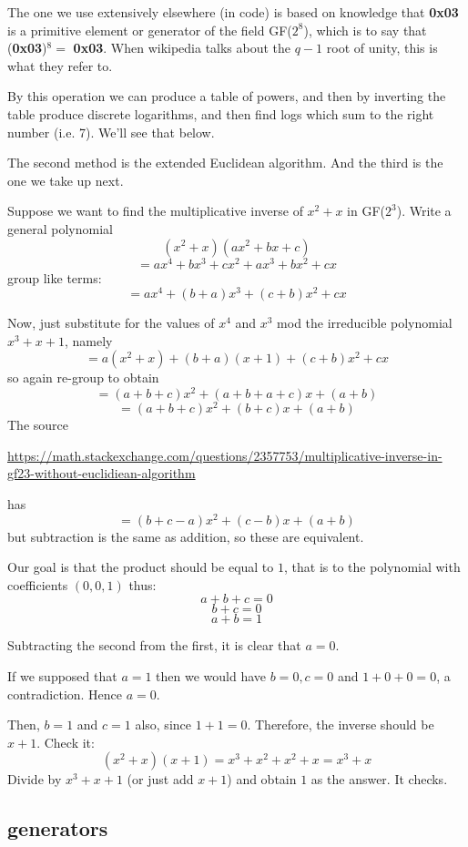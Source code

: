 \documentclass[11pt, oneside]{article}
\begin{document}
The one we use extensively elsewhere (in code) is based on knowledge that \textbf{0x03} is a primitive element or generator of the field GF($2^8$), which is to say that (\textbf{0x03})$^8 =$ \textbf{0x03}.  When wikipedia talks about the $q-1$ root of unity, this is what they refer to.

By this operation we can produce a table of powers, and then by inverting the table produce discrete logarithms, and then find logs which sum to the right number (i.e. 7).  We'll see that below.

 The second method is the extended Euclidean algorithm.  And the third is the one we take up next.

Suppose we want to find the multiplicative inverse of $x^2 + x$ in GF($2^3$).  Write a general polynomial
\[ (x^2 + x) (ax^2 + bx + c) \]
\[ = ax^4 + bx^3 + cx^2 + ax^3 + bx^2 + cx \]
group like terms:
\[ = ax^4 + (b + a)x^3 + (c + b)x^2 + cx \]

Now, just substitute for the values of $x^4$ and $x^3$ mod the irreducible polynomial $x^3 + x + 1$, namely
\[ =  a(x^2 + x) + (b + a)(x + 1) + (c + b)x^2 + cx \]
so again re-group to obtain
\[ = (a + b + c)x^2 + (a + b  + a + c)x + (a + b) \]
\[ = (a + b + c)x^2 + (b  + c)x + (a + b) \]
The source 

\url{https://math.stackexchange.com/questions/2357753/multiplicative-inverse-in-gf23-without-euclidiean-algorithm}

has
\[ = (b + c - a)x^2 + (c - b)x + (a + b) \]
but subtraction is the same as addition, so these are equivalent.

Our goal is that the product should be equal to $1$, that is to the polynomial with coefficients $(0,0,1)$ thus:
\[ a + b + c = 0 \]
\[ b + c = 0 \]
\[ a + b = 1 \]

Subtracting the second from the first, it is clear that $a = 0$.  

If we supposed that $a = 1$ then we would have $b = 0, c = 0$ and $1 + 0 + 0 = 0$, a contradiction.  Hence $a = 0$.

Then, $b = 1$ and $c = 1$ also, since $1 + 1 = 0$.  Therefore, the inverse should be $x + 1$.  Check it:
\[ (x^2 + x)(x + 1) = x^3 + x^2 + x^2 + x = x^3 + x \]
Divide by $x^3 + x + 1$ (or just add $x + 1$) and obtain $1$ as the answer.  It checks.

\subsection*{generators}
\end{document}
